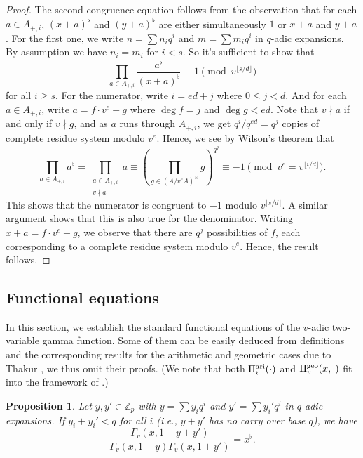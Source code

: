 \documentclass[11pt]{amsart}
\theoremstyle{plain}
\newtheorem{prop}[thm]{Proposition}
\theoremstyle{definition}
\theoremstyle{remark}
\numberwithin{equation}{section}
\newcommand{\ZZ}{\mathbb{Z}}
\newcommand{\floor}[1]{\lfloor #1 \rfloor}
\newcommand{\Ami}{A_{+,i}}
\newcommand{\vaf}{\Pi_v^{\textnormal{ari}}}
\newcommand{\vgf}{\Pi_v^{\textnormal{geo}}}
\newcommand{\vtg}{\Gamma_v}
\begin{document}
	\begin{proof}
		The second congruence equation follows from the observation that for each $a\in\Ami$, $(x+a)^\flat$ and $(y+a)^\flat$ are either simultaneously $1$ or $x+a$ and $y+a$.
		For the first one, we write $n=\sum n_iq^i$ and $m=\sum m_iq^i$ in $q$-adic expansions.
		By assumption we have $n_i = m_i$ for $i < s$.
		So it's sufficient to show that
		$$
		\prod_{a\in\Ami} \frac{a^\flat}{(x+a)^\flat} \equiv 1 \pmod{v^{\floor{s/d}}}
		$$
		for all $i\geq s$.
		For the numerator, write $i=ed+j$ where $0\leq j < d$.
		And for each $a\in\Ami$, write $a=f\cdot v^e+g$ where $\deg f=j$ and $\deg g<ed$.
		Note that $v\nmid a$ if and only if $v\nmid g$, and as $a$ runs through $\Ami$, we get $q^i/q^{ed} = q^j$ copies of complete residue system modulo $v^e$.
		Hence, we see by Wilson's theorem that
		$$
		\prod_{a\in\Ami} a^\flat
		= \prod_{\substack{a\in\Ami \\ v\nmid a}} a
		\equiv \left(\prod_{g \in (A/v^eA)^\times} g \right)^{q^j} 
		\equiv -1 \pmod{v^e = v^{\floor{i/d}}}.
		$$
		This shows that the numerator is congruent to $-1$ modulo $v^{\floor{s/d}}$.
		A similar argument shows that this is also true for the denominator.
		Writing $x+a = f\cdot v^e+g$, we observe that there are $q^j$ possibilities of $f$, each corresponding to a complete residue system modulo $v^e$.
		Hence, the result follows.
	\end{proof}
	
	\subsection{Functional equations}    \label{section-functional-equations}
	
	In this section, we establish the standard functional equations of the $v$-adic two-variable gamma function.
	Some of them can be easily deduced from definitions and the corresponding results for the arithmetic and geometric cases due to Thakur \cite{thakur1991gamma}, we thus omit their proofs.
	(We note that both $\vaf(\cdot)$ and $\vgf(x,\cdot)$ fit into the framework of \cite[Section 2]{thakur1991gamma}.)
	
	\begin{prop}
		Let $y,y' \in \ZZ_p$ with $y = \sum y_iq^i$ and $y' = \sum y_i'q^i$ in $q$-adic expansions.
		If $y_i+y_i' < q$ for all $i$ (i.e., $y+y'$ has no carry over base $q$), we have
		$$
		\frac{\vtg(x,1+y+y')}{\vtg(x,1+y)\vtg(x,1+y')}
		= x^\flat.
		$$
	\end{prop}
	
\end{document}

